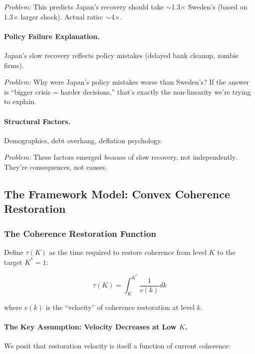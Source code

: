 \textit{Problem:} This predicts Japan's recovery should take $\sim$1.3× Sweden's 
(based on 1.3× larger shock). Actual ratio: $\sim$4×.

\paragraph{Policy Failure Explanation.}
Japan's slow recovery reflects policy mistakes (delayed bank cleanup, zombie firms).

\textit{Problem:} Why were Japan's policy mistakes worse than Sweden's? 
If the answer is ``bigger crisis = harder decisions,'' that's exactly 
the non-linearity we're trying to explain.

\paragraph{Structural Factors.}
Demographics, debt overhang, deflation psychology.

\textit{Problem:} These factors emerged \emph{because} of slow recovery, 
not independently. They're consequences, not causes.

\subsection{The Framework Model: Convex Coherence Restoration}

\subsubsection{The Coherence Restoration Function}

Define $\tau(K)$ as the time required to restore coherence from level $K$ 
to the target $K^* = 1$:

\begin{equation}
\tau(K) = \int_K^{K^*} \frac{1}{v(k)} dk
\label{eq:tau-integral}
\end{equation}

where $v(k)$ is the ``velocity'' of coherence restoration at level $k$.

\paragraph{The Key Assumption: Velocity Decreases at Low $K$.}

We posit that restoration velocity is itself a function of current coherence:

